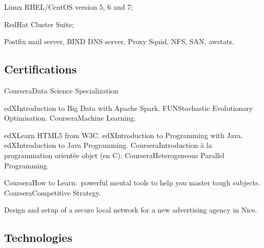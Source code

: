 \item{\bdot} Linux RHEL/CentOS version 5, 6 and 7;
\item{\bdot} RedHat Cluster Suite;
\item{\bdot} Postfix mail server, BIND DNS server, Proxy Squid, NFS, SAN, awstats.

\subsection{Certifications}

   {Coursera}{Data Science Specialization}


   {edX}{Introduction to Big Data with Apache Spark.}
   {FUN}{Stochastic Evolutionary Optimisation.}
   {Coursera}{Machine Learning.}

   
   {edX}{Learn HTML5 from W3C.}
   {edX}{Introduction to Programming with Java.}
   {edX}{Introduction to Java Programming.}
   {Coursera}{Introduction \`a la programmation orient\'ee objet (en C\plusplus).}
   {Coursera}{Heterogeneous Parallel Programming.}


   {Coursera}{How to Learn:~powerful mental tools to help you master tough subjects.}
   {Coursera}{Competitive Strategy.}


\bigskip
{}

\noindent
Design and setup of a secure local network for a new advertising agency in Nice.

\subsection{Technologies}

